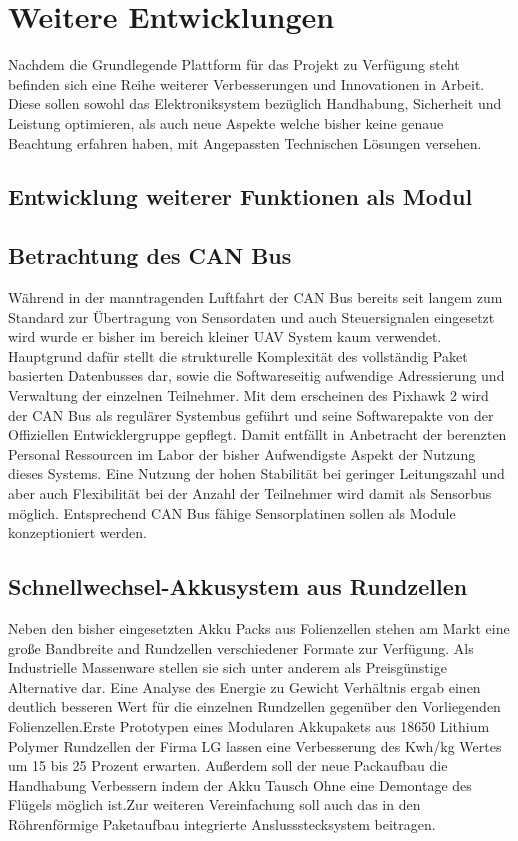 \chapter{Weitere Entwicklungen}\label{cha:Weitere Entwicklungen}

Nachdem die Grundlegende Plattform für das Projekt zu Verfügung steht befinden sich eine Reihe weiterer Verbesserungen und Innovationen in Arbeit. Diese sollen sowohl das Elektroniksystem bezüglich Handhabung, Sicherheit und Leistung optimieren, als auch neue Aspekte welche bisher keine genaue Beachtung erfahren haben, mit Angepassten Technischen Lösungen versehen.


\section{Entwicklung weiterer Funktionen als Modul}



\section{Betrachtung des CAN Bus}

Während in der manntragenden Luftfahrt der CAN Bus bereits seit langem zum Standard zur Übertragung von Sensordaten und auch Steuersignalen eingesetzt wird wurde er bisher im bereich kleiner UAV System kaum verwendet. Hauptgrund dafür stellt die strukturelle  Komplexität des vollständig Paket basierten Datenbusses dar, sowie die Softwareseitig aufwendige Adressierung und Verwaltung der einzelnen Teilnehmer.
Mit dem erscheinen des Pixhawk 2 wird der CAN Bus als regulärer Systembus geführt und seine Softwarepakte von der Offiziellen Entwicklergruppe gepflegt. Damit entfällt in Anbetracht der berenzten Personal Ressourcen im Labor der bisher Aufwendigste Aspekt der Nutzung dieses Systems. Eine Nutzung der hohen Stabilität bei geringer Leitungszahl und aber auch Flexibilität bei der Anzahl der Teilnehmer wird damit als Sensorbus möglich.
Entsprechend CAN Bus fähige Sensorplatinen sollen als Module konzeptioniert werden.

\section{Schnellwechsel-Akkusystem aus Rundzellen}

Neben den bisher eingesetzten Akku Packs aus Folienzellen stehen am Markt eine große Bandbreite and Rundzellen verschiedener Formate zur Verfügung. Als Industrielle Massenware stellen sie sich unter anderem als Preisgünstige Alternative dar.
Eine Analyse des Energie zu Gewicht Verhältnis ergab einen deutlich besseren Wert für die einzelnen Rundzellen gegenüber den Vorliegenden Folienzellen.Erste Prototypen eines Modularen Akkupakets aus 18650 Lithium Polymer Rundzellen der Firma LG lassen eine Verbesserung des Kwh/kg Wertes um 15 bis 25 Prozent erwarten.
Außerdem soll der neue Packaufbau die Handhabung Verbessern indem der Akku Tausch Ohne eine Demontage des Flügels möglich ist.Zur weiteren Vereinfachung soll auch das in den Röhrenförmige Paketaufbau integrierte Anslussstecksystem beitragen.

